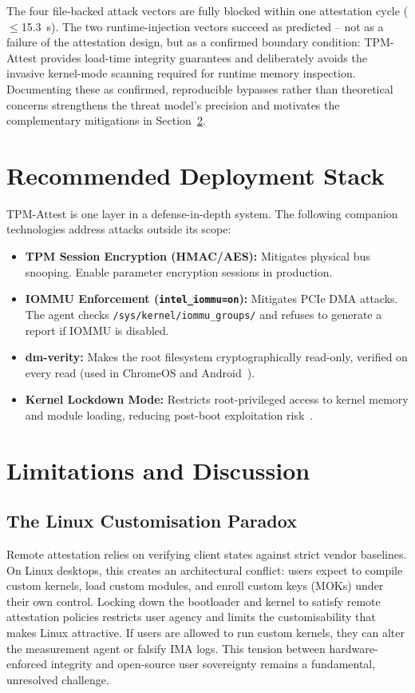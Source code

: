 \documentclass[11pt]{article}
\begin{document}
The four file-backed attack vectors are fully blocked within one attestation cycle ($\leq$15.3~s). The two runtime-injection vectors succeed as predicted -- not as a failure of the attestation design, but as a confirmed boundary condition: TPM-Attest provides load-time integrity guarantees and deliberately avoids the invasive kernel-mode scanning required for runtime memory inspection. Documenting these as confirmed, reproducible bypasses rather than theoretical concerns strengthens the threat model's precision and motivates the complementary mitigations in Section~\ref{sec:limitations}.

\section{Recommended Deployment Stack}

TPM-Attest is one layer in a defense-in-depth system. The following companion technologies address attacks outside its scope:

\begin{itemize}[nosep]
  \item \textbf{TPM Session Encryption (HMAC/AES):} Mitigates physical bus snooping. Enable parameter encryption sessions in production.
  \item \textbf{IOMMU Enforcement (\texttt{intel\_iommu=on}):} Mitigates PCIe DMA attacks. The agent checks \texttt{/sys/kernel/iommu\_groups/} and refuses to generate a report if IOMMU is disabled.
  \item \textbf{dm-verity:} Makes the root filesystem cryptographically read-only, verified on every read (used in ChromeOS and Android~\cite{chromeos2023dmverity}).
  \item \textbf{Kernel Lockdown Mode:} Restricts root-privileged access to kernel memory and module loading, reducing post-boot exploitation risk~\cite{poettering2021}.
\end{itemize}

\section{Limitations and Discussion}
\label{sec:limitations}

\subsection{The Linux Customisation Paradox}
Remote attestation relies on verifying client states against strict vendor baselines. On Linux desktops, this creates an architectural conflict: users expect to compile custom kernels, load custom modules, and enroll custom keys (MOKs) under their own control. Locking down the bootloader and kernel to satisfy remote attestation policies restricts user agency and limits the customisability that makes Linux attractive. If users are allowed to run custom kernels, they can alter the measurement agent or falsify IMA logs. This tension between hardware-enforced integrity and open-source user sovereignty remains a fundamental, unresolved challenge.
\end{document}
